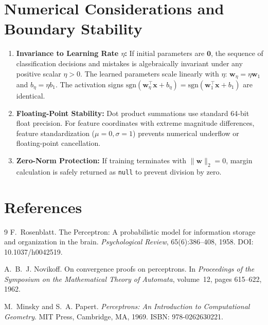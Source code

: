\documentclass[11pt]{article}
\begin{document}
\section{Numerical Considerations and Boundary Stability}
\label{sec:numerical}

\begin{enumerate}
    \item \textbf{Invariance to Learning Rate $\eta$:} If initial parameters are $\mathbf{0}$, the sequence of classification decisions and mistakes is algebraically invariant under any positive scalar $\eta > 0$. The learned parameters scale linearly with $\eta$: $\mathbf{w}_\eta = \eta \mathbf{w}_1$ and $b_\eta = \eta b_1$. The activation signs $\text{sgn}(\mathbf{w}_\eta^\top \mathbf{x} + b_\eta) = \text{sgn}(\mathbf{w}_1^\top \mathbf{x} + b_1)$ are identical.
    \item \textbf{Floating-Point Stability:} Dot product summations use standard 64-bit float precision. For feature coordinates with extreme magnitude differences, feature standardization ($\mu = 0, \sigma = 1$) prevents numerical underflow or floating-point cancellation.
    \item \textbf{Zero-Norm Protection:} If training terminates with $\|\mathbf{w}\|_2 = 0$, margin calculation is safely returned as \texttt{null} to prevent division by zero.
\end{enumerate}

\section{References}
\label{sec:references}

\begin{thebibliography}{9}
F.~Rosenblatt.
\newblock The Perceptron: A probabilistic model for information storage and organization in the brain.
\newblock \emph{Psychological Review}, 65(6):386--408, 1958.
\newblock DOI: 10.1037/h0042519.

A.~B.~J. Novikoff.
\newblock On convergence proofs on perceptrons.
\newblock In \emph{Proceedings of the Symposium on the Mathematical Theory of Automata}, volume~12, pages 615--622, 1962.

M.~Minsky and S.~A. Papert.
\newblock \emph{Perceptrons: An Introduction to Computational Geometry}.
\newblock MIT Press, Cambridge, MA, 1969.
\newblock ISBN: 978-0262630221.
\end{thebibliography}
\end{document}

